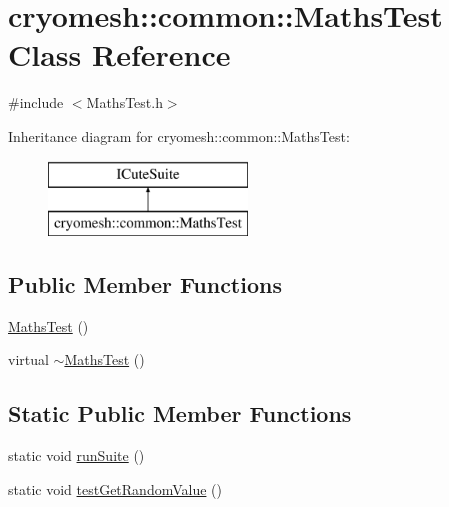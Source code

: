 \hypertarget{classcryomesh_1_1common_1_1_maths_test}{
\section{cryomesh::common::MathsTest Class Reference}
\label{classcryomesh_1_1common_1_1_maths_test}
}


{\ttfamily \#include $<$MathsTest.h$>$}

Inheritance diagram for cryomesh::common::MathsTest:\begin{figure}[H]
\begin{center}
\leavevmode
\includegraphics[height=2.000000cm]{classcryomesh_1_1common_1_1_maths_test}
\end{center}
\end{figure}
\subsection*{Public Member Functions}
\begin{DoxyCompactItemize}
\item 
\hyperlink{classcryomesh_1_1common_1_1_maths_test_a23f4e79814ad2077c29e505d03e1a066}{MathsTest} ()
\item 
virtual \hyperlink{classcryomesh_1_1common_1_1_maths_test_a2fbabfe02cbf4be738cdf14448039834}{$\sim$MathsTest} ()
\end{DoxyCompactItemize}
\subsection*{Static Public Member Functions}
\begin{DoxyCompactItemize}
\item 
static void \hyperlink{classcryomesh_1_1common_1_1_maths_test_ac8ff61d96b4026c9eed348d851b6b4fa}{runSuite} ()
\item 
static void \hyperlink{classcryomesh_1_1common_1_1_maths_test_acd403b741ca1c9ad580b8dfafd097ca2}{testGetRandomValue} ()
\end{DoxyCompactItemize}


